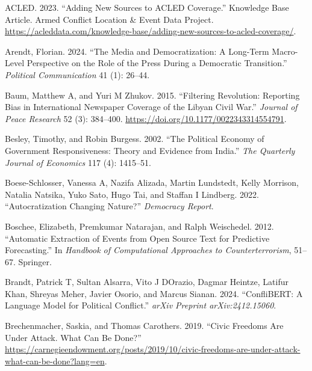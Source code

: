\documentclass[
  letterpaper,
  DIV=11,
  numbers=noendperiod]{scrartcl}
\newlength{\cslhangindent}
\newlength{\cslentryspacingunit} %
\newenvironment{CSLReferences}[2] %
 {%
  \setlength{\parindent}{0pt}
  \ifodd #1
  \let\oldpar\par
  \def\par{\hangindent=\cslhangindent\oldpar}
  \fi
  \setlength{\parskip}{#2\cslentryspacingunit}
 }%
 {}
\begin{document}
\hypertarget{refs}{}
\begin{CSLReferences}{1}{0}
\leavevmode{}%
ACLED. 2023. {``Adding New Sources to {ACLED} Coverage.''} Knowledge
Base Article. Armed Conflict Location \& Event Data Project.
\url{https://acleddata.com/knowledge-base/adding-new-sources-to-acled-coverage/}.

\leavevmode{}%
Arendt, Florian. 2024. {``The Media and Democratization: A Long-Term
Macro-Level Perspective on the Role of the Press During a Democratic
Transition.''} \emph{Political Communication} 41 (1): 26--44.

\leavevmode{}%
Baum, Matthew A, and Yuri M Zhukov. 2015. {``Filtering Revolution:
Reporting Bias in International Newspaper Coverage of the Libyan Civil
War.''} \emph{Journal of Peace Research} 52 (3): 384--400.
\url{https://doi.org/10.1177/0022343314554791}.

\leavevmode{}%
Besley, Timothy, and Robin Burgess. 2002. {``The Political Economy of
Government Responsiveness: Theory and Evidence from India.''} \emph{The
Quarterly Journal of Economics} 117 (4): 1415--51.

\leavevmode{}%
Boese-Schlosser, Vanessa A, Nazifa Alizada, Martin Lundstedt, Kelly
Morrison, Natalia Natsika, Yuko Sato, Hugo Tai, and Staffan I Lindberg.
2022. {``Autocratization Changing Nature?''} \emph{Democracy Report}.

\leavevmode{}%
Boschee, Elizabeth, Premkumar Natarajan, and Ralph Weischedel. 2012.
{``Automatic Extraction of Events from Open Source Text for Predictive
Forecasting.''} In \emph{Handbook of Computational Approaches to
Counterterrorism}, 51--67. Springer.

\leavevmode{}%
Brandt, Patrick T, Sultan Alsarra, Vito J DOrazio, Dagmar Heintze,
Latifur Khan, Shreyas Meher, Javier Osorio, and Marcus Sianan. 2024.
{``ConfliBERT: A Language Model for Political Conflict.''} \emph{arXiv
Preprint arXiv:2412.15060}.

\leavevmode{}%
Brechenmacher, Saskia, and Thomas Carothers. 2019. {``Civic Freedoms Are
Under Attack. What Can Be Done?''}
\url{https://carnegieendowment.org/posts/2019/10/civic-freedoms-are-under-attack-what-can-be-done?lang=en}.


\end{CSLReferences}
\end{document}
